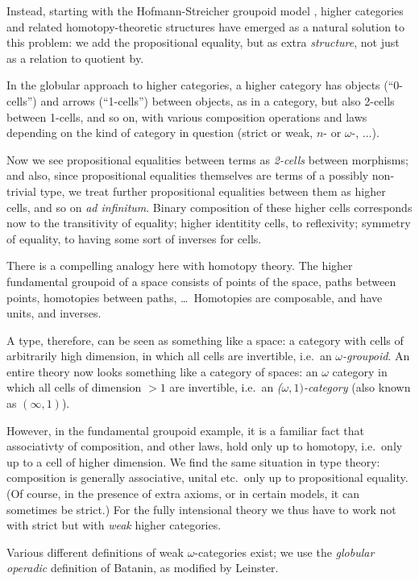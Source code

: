 \begin{para}Instead, starting with the Hofmann-Streicher groupoid model \cite{hofmann-streicher}, higher categories and related homotopy-theoretic structures have emerged as a natural solution to this problem: we add the propositional equality, but as extra \emph{structure}, not just as a relation to quotient by.

In the globular approach to higher categories, a higher category has objects (``0-cells'') and arrows (``1-cells'') between objects, as in a category, but also 2-cells between 1-cells, and so on, with various composition operations and laws depending on the kind of category in question (strict or weak, $n$- or $\omega$-, $\ldots$).

Now we see propositional equalities between terms as \emph{2-cells} between morphisms; and also, since propositional equalities themselves are terms of a possibly non-trivial type, we treat further propositional equalities between them as higher cells, and so on \emph{ad infinitum}.  Binary composition of these higher cells corresponds now to the transitivity of equality; higher identitity cells, to reflexivity; symmetry of equality, to having some sort of inverses for cells.

There is a compelling analogy here with homotopy theory.  The higher fundamental groupoid of a space consists of points of the space, paths between points, homotopies between paths, \ldots\ Homotopies are composable, and have units, and inverses.

A type, therefore, can be seen as something like a space: a category with cells of arbitrarily high dimension, in which all cells are invertible, i.e.\ an \emph{$\omega$-groupoid}.  An entire theory now looks something like a category of spaces: an $\omega$ category in which all cells of dimension $> 1$ are invertible, i.e.\ an \emph{($\omega,1)$-category} (also known as $(\infty,1)$).

However, in the fundamental groupoid example, it is a familiar fact that associativty of composition, and other laws, hold only up to homotopy, i.e.\ only up to a cell of higher dimension.  We find the same situation in type theory: composition is generally associative, unital etc.\ only up to propositional equality.  (Of course, in the presence of extra axioms, or in certain models, it can sometimes be strict.)  For the fully intensional theory we thus have to work not with strict but with \emph{weak} higher categories.

Various different definitions of weak $\omega$-categories exist; we use the \emph{globular operadic} definition of Batanin, as modified by Leinster. 
\end{para}

